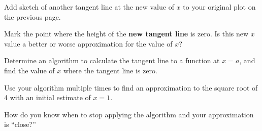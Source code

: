 \begin{problem}
\begin{subproblem}
  \item Add sketch of another tangent line at the new value of $x$ to
    your original plot on the previous page. 

  \item Mark the point where the height of the \textbf{new tangent line}
    is zero. Is this new $x$ value a better or worse approximation for
    the value of $x$?


  \end{subproblem}

  \clearpage

\item Determine an algorithm to calculate the tangent line to a
  function at $x=a$, and find the value of $x$ where the tangent line
  is zero.

  \vfill

\clearpage

\item Use your algorithm multiple times to find an approximation to
  the square root of 4 with an initial estimate of $x=1$.

  \vfill

\item How do you know when to stop applying the algorithm and your
  approximation is ``close?''

\end{problem}


\postClass

